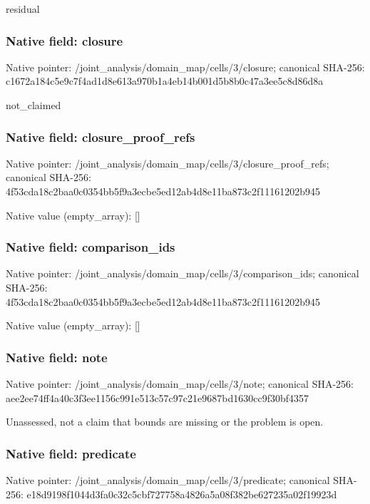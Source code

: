 \documentclass[10pt,a4paper]{article}
\begin{document}
\begingroup\raggedright\sloppy residual\par\endgroup

\subsubsection{Native field: closure}
Native pointer: /joint\_\allowbreak{}analysis/domain\_\allowbreak{}map/cells/3/closure; canonical SHA-256: c1672a184c5e9c7f4ad1d8e613a970b1a4eb14b001d5b8b0c47a3ee5c8d86d8a

\begingroup\raggedright\sloppy not\_\allowbreak{}claimed\par\endgroup

\subsubsection{Native field: closure\_\allowbreak{}proof\_\allowbreak{}refs}
Native pointer: /joint\_\allowbreak{}analysis/domain\_\allowbreak{}map/cells/3/closure\_\allowbreak{}proof\_\allowbreak{}refs; canonical SHA-256: 4f53cda18c2baa0c0354bb5f9a3ecbe5ed12ab4d8e11ba873c2f11161202b945

Native value (empty\_\allowbreak{}array): []

\subsubsection{Native field: comparison\_\allowbreak{}ids}
Native pointer: /joint\_\allowbreak{}analysis/domain\_\allowbreak{}map/cells/3/comparison\_\allowbreak{}ids; canonical SHA-256: 4f53cda18c2baa0c0354bb5f9a3ecbe5ed12ab4d8e11ba873c2f11161202b945

Native value (empty\_\allowbreak{}array): []

\subsubsection{Native field: note}
Native pointer: /joint\_\allowbreak{}analysis/domain\_\allowbreak{}map/cells/3/note; canonical SHA-256: aee2ee74ff4a40c3f3ee1156c991e513c57c97c21e9687bd1630cc9f30bf4357

\begingroup\raggedright\sloppy Unassessed,\allowbreak{} not a claim that bounds are missing or the problem is open.\par\endgroup

\subsubsection{Native field: predicate}
Native pointer: /joint\_\allowbreak{}analysis/domain\_\allowbreak{}map/cells/3/predicate; canonical SHA-256: e18d9198f1044d3fa0c32c5cbf727758a4826a5a08f382be627235a02f19923d
\end{document}
